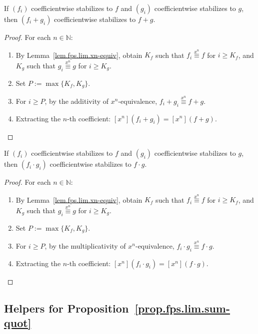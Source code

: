 \begin{lemma}
\label{prop.fps.lim.sum-prod.add-detail}
\leanhelper
\leanok
If $(f_i)$ coefficientwise stabilizes to $f$ and $(g_i)$ coefficientwise
stabilizes to $g$, then $(f_i + g_i)$ coefficientwise stabilizes to
$f + g$.
\end{lemma}

\begin{proof}
\leanok
For each $n\in\mathbb{N}$:
\begin{enumerate}
\item By Lemma~\ref{lem.fps.lim.xn-equiv}, obtain $K_f$ such that
  $f_i \overset{x^n}{\equiv} f$ for $i\geq K_f$, and $K_g$ such that
  $g_i \overset{x^n}{\equiv} g$ for $i\geq K_g$.
\item Set $P := \max\{K_f, K_g\}$.
\item For $i\geq P$, by the additivity of $x^n$-equivalence,
  $f_i + g_i \overset{x^n}{\equiv} f + g$.
\item Extracting the $n$-th coefficient:
  $[x^n](f_i + g_i) = [x^n](f + g)$.
\end{enumerate}
\end{proof}

\begin{lemma}
\label{prop.fps.lim.sum-prod.mul-detail}
\leanhelper
\leanok
If $(f_i)$ coefficientwise stabilizes to $f$ and $(g_i)$ coefficientwise
stabilizes to $g$, then $(f_i \cdot g_i)$ coefficientwise stabilizes to
$f \cdot g$.
\end{lemma}

\begin{proof}
\leanok
For each $n\in\mathbb{N}$:
\begin{enumerate}
\item By Lemma~\ref{lem.fps.lim.xn-equiv}, obtain $K_f$ such that
  $f_i \overset{x^n}{\equiv} f$ for $i\geq K_f$, and $K_g$ such that
  $g_i \overset{x^n}{\equiv} g$ for $i\geq K_g$.
\item Set $P := \max\{K_f, K_g\}$.
\item For $i\geq P$, by the multiplicativity of $x^n$-equivalence,
  $f_i \cdot g_i \overset{x^n}{\equiv} f \cdot g$.
\item Extracting the $n$-th coefficient:
  $[x^n](f_i \cdot g_i) = [x^n](f \cdot g)$.
\end{enumerate}
\end{proof}

\subsection{Helpers for Proposition~\ref{prop.fps.lim.sum-quot}}

